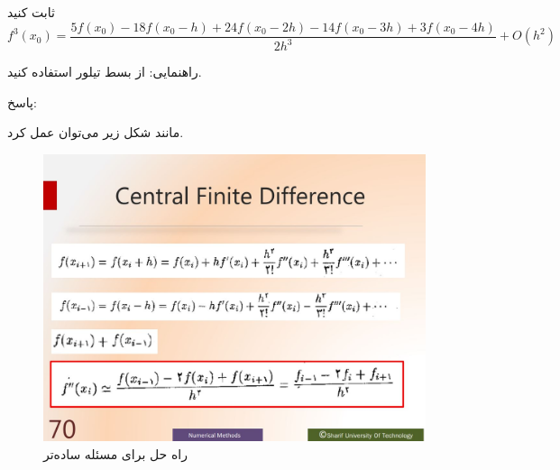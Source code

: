 ثابت کنید 
$$f^{3}(x_{0}) = \frac{5f(x_{0}) - 18f(x_{0} - h) + 24f(x_{0} - 2h) - 14f(x_{0} -3h) + 3f(x_{0} - 4h)}{2h^{3}} + O(h^{2})$$

راهنمایی: از بسط تیلور استفاده کنید.


پاسخ:


مانند شکل زیر می‌توان عمل کرد.

\begin{center}
    \begin{figure}[H]
        \centering
        \includegraphics[width=0.8\linewidth]{q5.JPG}
        \caption{راه حل برای مسئله ساده‌تر}
        \label{fig:1}
    \end{figure}
\end{center}